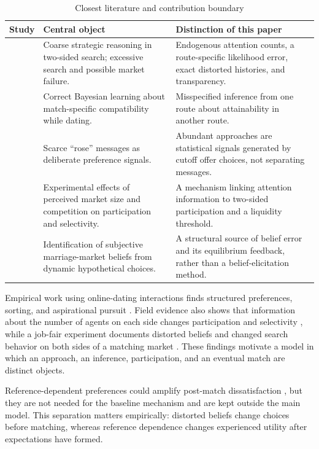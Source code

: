 \documentclass[11pt]{article}
\begin{document}
\begin{table}[ht]
\centering
\caption{Closest literature and contribution boundary}
\label{tab:closest-literature}
\footnotesize
\begin{tabularx}{\textwidth}{@{}>{\raggedright\arraybackslash}p{}YY@{}}
\toprule
Study & Central object & Distinction of this paper \\
\midrule
\citet{antler2022} & Coarse strategic reasoning in two-sided search; excessive
search and possible market failure. & Endogenous attention counts, a
route-specific likelihood error, exact distorted histories, and transparency.\\
\citet{antler2026} & Correct Bayesian learning about match-specific
compatibility while dating. & Misspecified inference from one route about
attainability in another route.\\
\citet{lee2015} & Scarce ``rose'' messages as deliberate preference signals. &
Abundant approaches are statistical signals generated by cutoff offer choices,
not separating messages.\\
\citet{fong2024} & Experimental effects of perceived market size and competition
on participation and selectivity. & A mechanism linking attention information
to two-sided participation and a liquidity threshold.\\
\citet{andrew2025} & Identification of subjective marriage-market beliefs from
dynamic hypothetical choices. & A structural source of belief error and its
equilibrium feedback, rather than a belief-elicitation method.\\
\bottomrule
\end{tabularx}
\end{table}

Empirical work using online-dating interactions finds structured preferences,
sorting, and aspirational pursuit \citep{hitsch2010,bruch2018}. Field evidence
also shows that information about the number of agents on each side changes
participation and selectivity \citep{fong2024}, while a job-fair experiment
documents distorted beliefs and changed search behavior on both sides of a
matching market \citep{abebe2025}. These findings motivate a model in which an
approach, an inference, participation, and an eventual match are distinct
objects.

Reference-dependent preferences could amplify post-match dissatisfaction
\citep{koszegi2006}, but they are not needed for the baseline mechanism and are
kept outside the main model. This separation matters empirically: distorted
beliefs change choices before matching, whereas reference dependence changes
experienced utility after expectations have formed.
\end{document}
